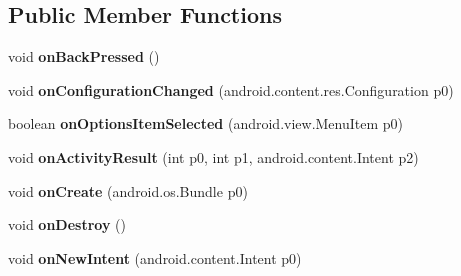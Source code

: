 \subsection*{Public Member Functions}
\begin{DoxyCompactItemize}
\item 
\mbox{\label{classmd5b60ffeb829f638581ab2bb9b1a7f4f3f_1_1FormsAppCompatActivity_a13db69171e2e438c4fbbb5f59fa9b0fe}} 
void {\bfseries on\+Back\+Pressed} ()
\item 
\mbox{\label{classmd5b60ffeb829f638581ab2bb9b1a7f4f3f_1_1FormsAppCompatActivity_a6efff316f1a0c8e543de9844c36ea857}} 
void {\bfseries on\+Configuration\+Changed} (android.\+content.\+res.\+Configuration p0)
\item 
\mbox{\label{classmd5b60ffeb829f638581ab2bb9b1a7f4f3f_1_1FormsAppCompatActivity_ad71679491ce674b6fcefc81dcc73fbcd}} 
boolean {\bfseries on\+Options\+Item\+Selected} (android.\+view.\+Menu\+Item p0)
\item 
\mbox{\label{classmd5b60ffeb829f638581ab2bb9b1a7f4f3f_1_1FormsAppCompatActivity_af329e41b3d57d0e505dd932a5d073788}} 
void {\bfseries on\+Activity\+Result} (int p0, int p1, android.\+content.\+Intent p2)
\item 
\mbox{\label{classmd5b60ffeb829f638581ab2bb9b1a7f4f3f_1_1FormsAppCompatActivity_a54bbc6de9184a753b146e365d02fdaa1}} 
void {\bfseries on\+Create} (android.\+os.\+Bundle p0)
\item 
\mbox{\label{classmd5b60ffeb829f638581ab2bb9b1a7f4f3f_1_1FormsAppCompatActivity_ae9b5956435d3ea855e30420a6bde26f8}} 
void {\bfseries on\+Destroy} ()
\item 
\mbox{\label{classmd5b60ffeb829f638581ab2bb9b1a7f4f3f_1_1FormsAppCompatActivity_a3a5e7bf9d05c545fe127901e0908a237}} 
void {\bfseries on\+New\+Intent} (android.\+content.\+Intent p0)

\end{DoxyCompactItemize}
